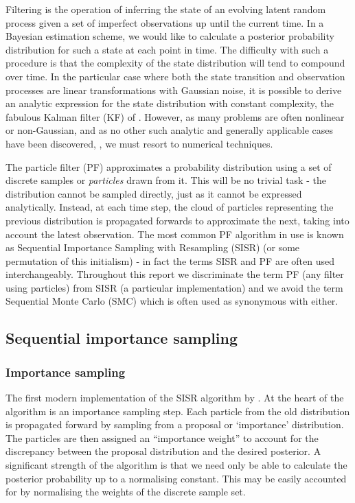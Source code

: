 Filtering is the operation of inferring the state of an evolving latent random process given a set of imperfect observations up until the current time. In a Bayesian estimation scheme, we would like to calculate a posterior probability distribution for such a state at each point in time. The difficulty with such a procedure is that the complexity of the state distribution will tend to compound over time. In the particular case where both the state transition and observation processes are linear transformations with Gaussian noise, it is possible to derive an analytic expression for the state distribution with constant complexity, the fabulous Kalman filter (KF) of \cite{Kalman1960}. However, as many problems are often nonlinear or non-Gaussian, and as no other such analytic and generally applicable cases have been discovered, \cite{Daum2005}, we must resort to numerical techniques.

The particle filter (PF) approximates a probability distribution using a set of discrete samples or \emph{particles} drawn from it. This will be no trivial task - the distribution cannot be sampled directly, just as it cannot be expressed analytically. Instead, at each time step, the cloud of particles representing the previous distribution is propagated forwards to approximate the next, taking into account the latest observation. The most common PF algorithm in use is known as Sequential Importance Sampling with Resampling (SISR) (or some permutation of this initialism) - in fact the terms SISR and PF are often used interchangeably. Throughout this report we discriminate the term PF (any filter using particles) from SISR (a particular implementation) and we avoid the term Sequential Monte Carlo (SMC) which is often used as synonymous with either.

\subsection{Sequential importance sampling}

\subsubsection{Importance sampling}
The first modern implementation of the SISR algorithm by \cite{Gordon1993}. At the heart of the algorithm is an importance sampling step. Each particle from the old distribution is propagated forward by sampling from a proposal or `importance' distribution. The particles are then assigned an ``importance weight'' to account for the discrepancy between the proposal distribution and the desired posterior. A significant strength of the algorithm is that we need only be able to calculate the posterior probability up to a normalising constant. This may be easily accounted for by normalising the weights of the discrete sample set.

